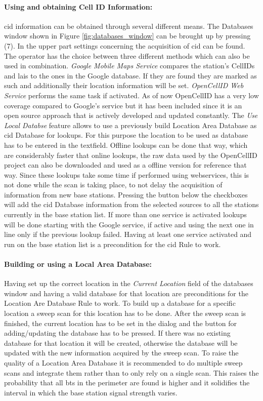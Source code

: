 \paragraph{Using and obtaining Cell ID Information:} \gls{cid} information can be obtained through several different means.
The Databases window shown in Figure \ref{fig:databases_window} can be brought up by pressing (7).
In the upper part settings concerning the acquisition of \gls{cid} can be found.
The operator has the choice between three different methods which can also be used in combination.
\emph{Google Mobile Maps Service} compares the station's CellIDs and \glspl{lai} to the ones in the Google database.
If they are found they are marked as such and additionally their location information will be set.
\emph{OpenCellID Web Service} performs the same task if activated.
As of now OpenCellID has a very low coverage compared to Google's service but it has been included since it is an open source approach that is actively developed and updated constantly.
The \emph{Use Local Databse} feature allows to use a previously build Location Area Database as \gls{cid} Database for lookups.
For this purpose the location to be used as database has to be entered in the textfield.
Offline lookups can be done that way, which are considerably faster that online lookups, the raw data used by the OpenCellID project can also be downloaded and used as a offline version for reference that way.
Since these lookups take some time if performed using webservices, this is not done while the scan is taking place, to not delay the acquisition of information from new base stations.
Pressing the button below the checkboxes will add the \gls{cid} Database information from the selected sources to all the stations currently in the base station list.
If more than one service is activated lookups will be done starting with the Google service, if active and using the next one in line only if the previous lookup failed.
Having at least one service activated and run on the base station list is a precondition for the \gls{cid} Rule to work.

\paragraph{Building or using a Local Area Database:} Having set up the correct location in the \emph{Current Location} field of the databases window and having a valid database for that location are preconditions for the Location Are Database Rule to work.
To build up a database for a specific location a sweep scan for this location has to be done.
After the sweep scan is finished, the current location has to be set in the dialog and the button for adding/updating the database has to be pressed.
If there was no existing database for that location it will be created, otherwise the database will be updated with the new information acquired by the sweep scan.
To raise the quality of a Location Area Database it is recommended to do multiple sweep scans and integrate them rather than to only rely on a single scan.
This raises the probability that all \gls{bts} in the perimeter are found is higher and it solidifies the interval in which the base station signal strength varies.

